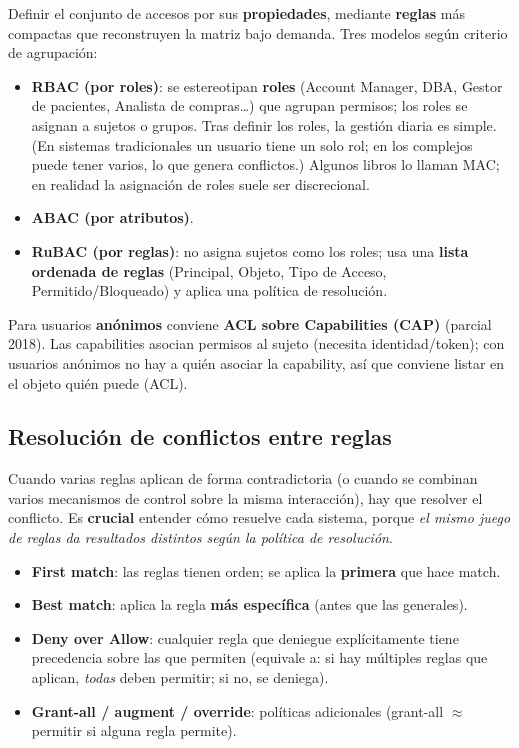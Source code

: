 \documentclass[../main.tex]{subfiles}
\begin{document}
Definir el conjunto de accesos por sus \textbf{propiedades}, mediante \textbf{reglas} más compactas que reconstruyen la matriz bajo demanda. Tres modelos según criterio de agrupación:
\begin{itemize}[nosep]
  \item \textbf{RBAC (por roles)}: se estereotipan \textbf{roles} (Account Manager, DBA, Gestor de pacientes, Analista de compras\dots) que agrupan permisos; los roles se asignan a sujetos o grupos. Tras definir los roles, la gestión diaria es simple. (En sistemas tradicionales un usuario tiene un solo rol; en los complejos puede tener varios, lo que genera conflictos.) Algunos libros lo llaman MAC; en realidad la asignación de roles suele ser discrecional.
  \item \textbf{ABAC (por atributos)}.
  \item \textbf{RuBAC (por reglas)}: no asigna sujetos como los roles; usa una \textbf{lista ordenada de reglas} (Principal, Objeto, Tipo de Acceso, Permitido/Bloqueado) y aplica una política de resolución.
\end{itemize}

\begin{ojo}
Para usuarios \textbf{anónimos} conviene \textbf{ACL sobre Capabilities (CAP)} (parcial 2018). Las capabilities asocian permisos al sujeto (necesita identidad/token); con usuarios anónimos no hay a quién asociar la capability, así que conviene listar en el objeto quién puede (ACL).
\end{ojo}

\subsection{Resolución de conflictos entre reglas}

Cuando varias reglas aplican de forma contradictoria (o cuando se combinan varios mecanismos de control sobre la misma interacción), hay que resolver el conflicto. Es \textbf{crucial} entender cómo resuelve cada sistema, porque \emph{el mismo juego de reglas da resultados distintos según la política de resolución}.

\begin{itemize}[nosep]
  \item \textbf{First match}: las reglas tienen orden; se aplica la \textbf{primera} que hace match.
  \item \textbf{Best match}: aplica la regla \textbf{más específica} (antes que las generales).
  \item \textbf{Deny over Allow}: cualquier regla que deniegue explícitamente tiene precedencia sobre las que permiten (equivale a: si hay múltiples reglas que aplican, \emph{todas} deben permitir; si no, se deniega).
  \item \textbf{Grant-all / augment / override}: políticas adicionales (grant-all $\approx$ permitir si alguna regla permite).
\end{itemize}
\end{document}
